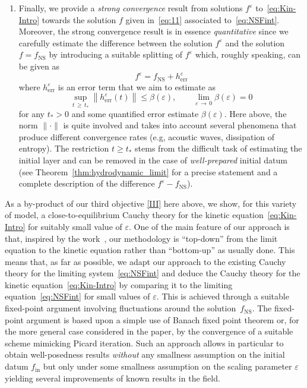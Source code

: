 \documentclass[10pt]{amsart}
\theoremstyle{definition}\newtheorem{defi}[theo]{Definition}\newtheorem{rema}[theo]{Remark}\newtheorem{exam}[theo]{Example}\newtheorem{exem}[theo]{Example}\newtheorem{nota}[theo]{Notation}
\newcommand{\ini}{\mathrm{in}}
\newcommand{\err}{\mathrm{err}}
\newcommand{\ns}{\mathrm{NS}}
\renewcommand*\ge{\geqslant}
\renewcommand*\leq{\leqslant}
\renewcommand*\geq{\geqslant}
\newcommand*\eps{{\varepsilon}}
\begin{document}
\begin{enumerate}
\item\label{III} Finally, we provide a \emph{strong convergence} result from solutions $f^\eps$ to~\eqref{eq:Kin-Intro} towards the solution $f$ given in~\eqref{eq:11} associated to~\eqref{eq:NSFint}. Moreover, the strong convergence result is in essence \emph{quantitative} since we carefully estimate the difference between the solution $f^{\eps}$ and the solution $f=f_{\ns}$ by introducing a suitable splitting of $f^{\eps}$ which, roughly speaking, can be given as
\[
f^{\eps}=f_{\ns} + h^{\eps}_{\err}
\]
where $h_{\err}^{\eps}$ is an error term that we aim to estimate as
\[
\sup_{t\,\ge\,t_{*}}\left\|h_{\err}^{\eps}(t)\right\| \leq \beta(\eps), \qquad \lim_{\eps\,\to\,0}\beta(\eps)=0
\]
for any $t_{*} >0$ and some quantified error estimate $\beta(\eps)$. Here above, the norm $\|\cdot\|$ is quite involved and takes into account several phenomena that produce different convergence rates (e.g, acoustic waves, dissipation of entropy). The restriction $t \geq t_{*}$ stems from the difficult task of estimating the initial layer and can be removed in the case of \emph{well-prepared} initial datum (see Theorem~\ref{thm:hydrodynamic_limit} for a precise statement and a complete description of the difference $f^{\eps}-f_{\ns}$).
\end{enumerate}

As a by-product of our third objective \eqref{III} here above, we show, for this variety of model, a close-to-equilibrium Cauchy theory for the kinetic equation~\eqref{eq:Kin-Intro} for suitably small value of $\eps$. One of the main feature of our approach is that, inspired by the work~\cite{GT2020}, our methodology is ``top-down'' from the limit equation to the kinetic equation rather than ``bottom-up'' as usually done. This means that, as far as possible, we adapt our approach to the existing Cauchy theory for the limiting system~\eqref{eq:NSFint} and deduce the Cauchy theory for the kinetic equation~\eqref{eq:Kin-Intro} by comparing it to the limiting equation~\eqref{eq:NSFint} for small values of $\eps.$ This is achieved through a suitable fixed-point argument involving fluctuations around the solution~$f_{\ns}$. The fixed-point argument is based upon a simple use of Banach fixed point theorem or, for the more general case considered in the paper, by the convergence of a suitable scheme mimicking Picard iteration. Such an approach allows in particular to obtain well-posedness results \emph{without} any smallness assumption on the initial datum $f_{\ini}$ but only under some smallness assumption on the scaling parameter $\eps$ yielding several improvements of known results in the field.
\end{document}
